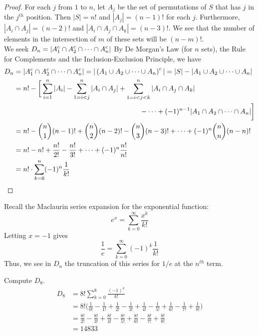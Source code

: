\documentclass[handout]{ximera}
\begin{document}
\begin{proof}
For each $j$ from $1$ to $n$, let $A_j$ be the set of permutations of $S$ that has $j$ in the $j^{th}$ position.
Then $|S| = n!$ and $|A_j| = (n-1)!$ for each $j$. Furthermore, $|A_i \cap A_j| = (n-2)!$ and $|A_i \cap A_j \cap A_k| = (n-3)!$.
We see that the number of elements in the intersection of $m$ of these sets will be $(n-m)!$.\\
We seek $\displaystyle D_n = |A_1^c \cap A_2^c \cap \cdots \cap A_n^c|$
By De Morgan's Law (for $n$ sets), the Rule for Complements and the Inclusion-Exclusion Principle, we have
\begin{align*}
D_n &= |A_1^c \cap A_2^c \cap \cdots \cap A_n^c| = |\left(A_1 \cup A_2 \cup \cdots \cup A_n\right)^c|
   = |S| - |A_1 \cup A_2 \cup \cdots \cup A_n|\\
   &= n! - \bigg[\sum_{i =1}^n |A_i| - \sum_{1 =i<j}^n |A_i\cap A_j|+ 
   \sum_{1 =i<j< k}^n |A_i\cap A_j \cap A_k| \\
   &\hspace{2.5 in} - \cdots + (-1)^{n-1} |A_1 \cap A_2 \cap \cdots \cap A_n|\bigg]\\
   &= n! - \binom{n}{1}(n-1)! + \binom{n}{2}(n-2)! - \binom{n}{3}(n-3)! + \cdots + (-1)^n \binom{n}{n}(n-n)!\\
   &= n! - n! + \frac{n!}{2!} - \frac{n!}{3!} + \cdots + (-1)^n \frac{n!}{n!}\\
   &= n! \cdot \sum_{k=0}^n (-1)^n \frac{1}{k!}
\end{align*}


\end{proof}


\begin{remark}
Recall the Maclaurin series expansion for the exponential function:
\[
e^x = \sum_{k = 0}^\infty \frac{x^k}{k!}
\]
Letting $x = -1$ gives
\[
\frac{1}{e} = \sum_{k = 0}^\infty (-1)^k\frac{1}{k!}
\]
Thus, we see in $D_n$ the truncation of this series for $1/e$ at the $n^{th}$ term.
\end{remark}


\begin{example}[example 2]
Compute $D_8$.\\
\begin{align*}
D_8 &= 8! \sum_{k=0}^8 \frac{(-1)^k}{k!}\\
&= 8!\big(\frac{1}{0!} - \frac{1}{1!} + \frac{1}{2!} - \frac{1}{3!} + \frac{1}{4!}- \frac{1}{5!} + \frac{1}{6!} - \frac{1}{7!} + \frac{1}{8!}\big) \\
&=  \frac{8!}{2!} - \frac{8!}{3!} + \frac{8!}{4!} - \frac{8!}{5!} + \frac{8!}{6!} - \frac{8!}{7!} + \frac{8!}{8!} \\
&= 14833
\end{align*}
\end{example}
\end{document}
